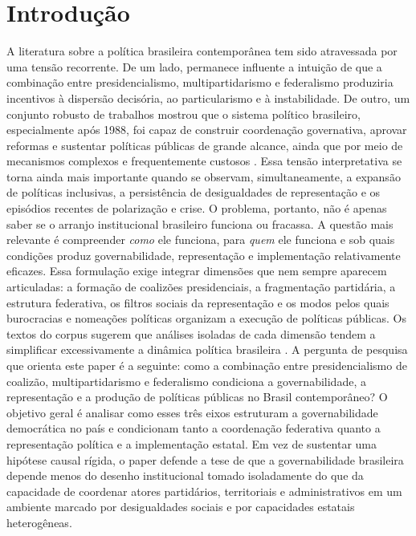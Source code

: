 \documentclass[12pt,a4paper]{article}
\begin{document}
\section{Introdução}
\label{sec:org862bf08}
A literatura sobre a política brasileira contemporânea tem sido atravessada por uma tensão recorrente. De um lado, permanece influente a intuição de que a combinação entre presidencialismo, multipartidarismo e federalismo produziria incentivos à dispersão decisória, ao particularismo e à instabilidade. De outro, um conjunto robusto de trabalhos mostrou que o sistema político brasileiro, especialmente após 1988, foi capaz de construir coordenação governativa, aprovar reformas e sustentar políticas públicas de grande alcance, ainda que por meio de mecanismos complexos e frequentemente custosos \parencite{palermo2000_como_se,limongi2017_a_crise}. Essa tensão interpretativa se torna ainda mais importante quando se observam, simultaneamente, a expansão de políticas inclusivas, a persistência de desigualdades de representação e os episódios recentes de polarização e crise.
O problema, portanto, não é apenas saber se o arranjo institucional brasileiro funciona ou fracassa. A questão mais relevante é compreender \emph{como} ele funciona, para \emph{quem} ele funciona e sob quais condições produz governabilidade, representação e implementação relativamente eficazes. Essa formulação exige integrar dimensões que nem sempre aparecem articuladas: a formação de coalizões presidenciais, a fragmentação partidária, a estrutura federativa, os filtros sociais da representação e os modos pelos quais burocracias e nomeações políticas organizam a execução de políticas públicas. Os textos do corpus sugerem que análises isoladas de cada dimensão tendem a simplificar excessivamente a dinâmica política brasileira \parencite{guy2022_bringing_political,panizza2022_the_politics}.
A pergunta de pesquisa que orienta este paper é a seguinte: como a combinação entre presidencialismo de coalizão, multipartidarismo e federalismo condiciona a governabilidade, a representação e a produção de políticas públicas no Brasil contemporâneo? O objetivo geral é analisar como esses três eixos estruturam a governabilidade democrática no país e condicionam tanto a coordenação federativa quanto a representação política e a implementação estatal. Em vez de sustentar uma hipótese causal rígida, o paper defende a tese de que a governabilidade brasileira depende menos do desenho institucional tomado isoladamente do que da capacidade de coordenar atores partidários, territoriais e administrativos em um ambiente marcado por desigualdades sociais e por capacidades estatais heterogêneas.
\end{document}
